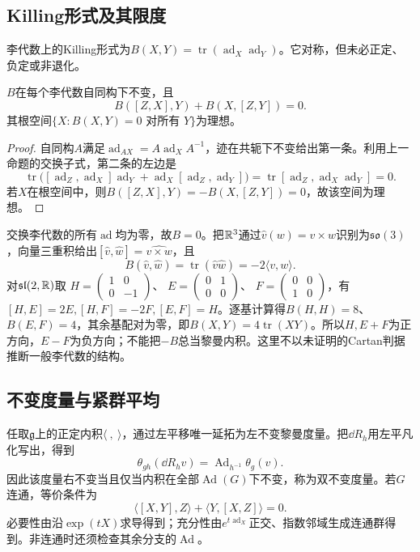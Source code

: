 \subsection{Killing形式及其限度}
\begin{definition}
李代数上的Killing形式为$B(X,Y)=\operatorname{tr}(\operatorname{ad}_X\operatorname{ad}_Y)$。它对称，但未必正定、负定或非退化。
\end{definition}
\begin{proposition}\label{prop:lie-killing}
$B$在每个李代数自同构下不变，且
\[
 B([Z,X],Y)+B(X,[Z,Y])=0.
\]
其根空间$\{X:B(X,Y)=0\text{ 对所有 }Y\}$为理想。
\end{proposition}
\begin{proof}
自同构$A$满足$\operatorname{ad}_{AX}=A\operatorname{ad}_XA^{-1}$，迹在共轭下不变给出第一条。利用上一命题的交换子式，第二条的左边是
\[
 \operatorname{tr}\bigl([\operatorname{ad}_Z,\operatorname{ad}_X]\operatorname{ad}_Y
 +\operatorname{ad}_X[\operatorname{ad}_Z,\operatorname{ad}_Y]\bigr)
 =\operatorname{tr}[\operatorname{ad}_Z,\operatorname{ad}_X\operatorname{ad}_Y]=0.
\]
若$X$在根空间中，则$B([Z,X],Y)=-B(X,[Z,Y])=0$，故该空间为理想。
\end{proof}

\begin{example}
交换李代数的所有$\operatorname{ad}$均为零，故$B=0$。把$\mathbb{R}^3$通过$\widehat v(w)=v\times w$识别为$\mathfrak{so}(3)$，向量三重积给出$[\widehat v,\widehat w]=\widehat{v\times w}$，且
\[
 B(\widehat v,\widehat w)=\operatorname{tr}(\widehat v\widehat w)=-2\langle v,w\rangle.
\]
对$\mathfrak{sl}(2,\mathbb{R})$取
$H=\left(\begin{smallmatrix}1&0\\0&-1\end{smallmatrix}\right)$、
$E=\left(\begin{smallmatrix}0&1\\0&0\end{smallmatrix}\right)$、
$F=\left(\begin{smallmatrix}0&0\\1&0\end{smallmatrix}\right)$，有
$[H,E]=2E,[H,F]=-2F,[E,F]=H$。逐基计算得$B(H,H)=8$、$B(E,F)=4$，其余基配对为零，即$B(X,Y)=4\operatorname{tr}(XY)$。所以$H,E+F$为正方向，$E-F$为负方向；不能把$-B$总当黎曼内积。这里不以未证明的Cartan判据推断一般李代数的结构。
\end{example}

\subsection{不变度量与紧群平均}
任取$\mathfrak g$上的正定内积$\langle\ ,\ \rangle$，通过左平移唯一延拓为左不变黎曼度量。把$\dd R_h$用左平凡化写出，得到
\[
 \theta_{gh}(\dd R_h v)=\operatorname{Ad}_{h^{-1}}\theta_g(v).
\]
因此该度量右不变当且仅当内积在全部$\operatorname{Ad}(G)$下不变，称为双不变度量。若$G$连通，等价条件为
\begin{equation}\label{eq:lie-ad-skew}
 \langle[X,Y],Z\rangle+\langle Y,[X,Z]\rangle=0.
\end{equation}
必要性由沿$\exp(tX)$求导得到；充分性由$e^{t\operatorname{ad}_X}$正交、指数邻域生成连通群得到。非连通时还须检查其余分支的$\operatorname{Ad}$。

